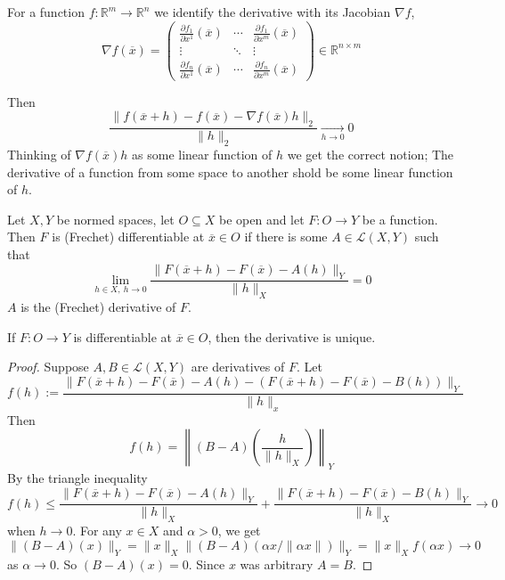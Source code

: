 For a function $f : \mathbb R^m \to \mathbb R^n$ we identify 
the derivative with its Jacobian $\nabla f$, 
\[
    \nabla f(\overline{x}) =
    \begin{pmatrix}
        \frac{\partial f_1}{\partial x^1}(\overline{x}) & \cdots & \frac{\partial f_1}{\partial x^m}(\overline{x}) \\
        \vdots & \ddots & \vdots \\
        \frac{\partial f_n}{\partial x^1}(\overline{x}) & \cdots & \frac{\partial f_n}{\partial x^m}(\overline{x})
    \end{pmatrix}
    \in \mathbb R^{n\times m}
\]

Then 
\[
    \frac{\| f(\overline x + h) - f(\overline x) - 
    \nabla f(\overline x)h\|_2}{\|h\|_2} \underset{h\to 0}{\to}0
\]
Thinking of $\nabla f(\overline x)h$ as some linear function 
of $h$ we get the correct notion; The derivative of 
a function from some space to another shold be some linear function 
of $h$.

\begin{defn}
    Let $X,Y$ be normed spaces, let $O \subseteq X$ be open 
    and let $F : O \to Y$ be a function. 
    Then $F$ is (Frechet) differentiable at $\overline x \in O$
    if there is some $A \in \mathcal L(X,Y)$ such that 
    \[
        \lim_{h\in X, \ h\to 0}\frac{\|F(\overline x + h) - 
        F(\overline x) - A(h)\|_Y}{\|h\|_X} = 0
    \]
    $A$ is the (Frechet) derivative of $F$.
\end{defn}

\begin{lem}
    If $F: O \to Y$ is differentiable at $\overline x \in O$, 
    then the derivative is unique.
\end{lem}
\begin{proof}
    Suppose $A,B \in \mathcal L(X,Y)$ are derivatives of 
    $F$. Let 
    \[
        f(h) := \frac{\|F(\overline x + h) - 
        F(\overline x) - A(h) - (F(\overline x + h)- F(\overline x)
        - B(h))\|_Y}{\|h\|_x}
    \]
    Then 
    \[
        f(h) = \left\|(B-A)\left(\frac{h}{\|h\|_X}\right)\right\|_Y
    \]
    By the triangle inequality 
    \[
        f(h) \leq 
        \frac{\|F(\overline x + h) - F(\overline x) - 
        A(h)\|_Y}{\|h\|_X} + 
        \frac{\|F(\overline x + h) - F(\overline x) - 
        B(h)\|_Y}{\|h\|_X} \to 0
    \]
    when $h \to 0$. 
    For any $x \in X$ and $\alpha > 0$, we get 
    \[
        \|(B-A)(x)\|_Y = \|x\|_X \|(B-A)(\alpha x/\|\alpha x\|)\|_Y
        = \|x\|_X f(\alpha x) \to 0
    \]
    as $\alpha \to 0$. So $(B-A)(x) = 0$. Since $x$ was arbitrary 
    $A = B$.
\end{proof}

